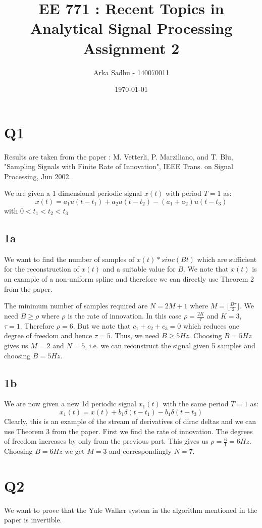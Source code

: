 \documentclass{article}
\title{EE 771 : Recent Topics in Analytical Signal Processing Assignment 2}
\author{Arka Sadhu - 140070011}
\date{\today}
\begin{document}
\maketitle

\section*{Q1}
Results are taken from the paper : M. Vetterli, P. Marziliano, and T. Blu, "Sampling Signals with Finite Rate of Innovation", IEEE Trans. on Signal Processing, Jun 2002.

We are given a 1 dimensional periodic signal $x(t)$ with period $T=1$ as:
$$x(t) = a_1 u(t - t_1) + a_2 u(t - t_2) - (a_1 + a_2) u(t - t_3)$$
with $0 < t_1 < t_2 < t_3$
\subsection*{1a}
We want to find the number of samples of $x(t) * sinc(Bt)$ which are sufficient for the reconstruction of $x(t)$ and a suitable value for $B$. We note that $x(t)$ is an example of a non-uniform spline and therefore we can directly use Theorem 2 from the paper.

The minimum number of samples required are $N = 2M + 1$ where $M = \lfloor \frac{B \tau}{2} \rfloor$. We need $B \ge \rho$ where $\rho$ is the rate of innovation. In this case $\rho = \frac{2K}{\tau}$ and $K = 3$, $\tau = 1$. Therefore $\rho = 6$. But we note that $c_1 + c_2 + c_3 = 0$ which reduces one degree of freedom and hence $\tau = 5$. Thus, we need $B \ge 5Hz$. Choosing $B = 5Hz$ gives us $M = 2$ and $N = 5$, i.e. we can reconstruct the signal given 5 samples and choosing $B = 5Hz$.

\subsection*{1b}
We are now given a new 1d periodic signal $x_1(t)$ with the same period $T=1$ as:
$$x_1(t) = x(t) + b_1 \delta (t - t_1) - b_1 \delta (t - t_3)$$
Clearly, this is an example of the stream of derivatives of dirac deltas and we can use Theorem 3 from the paper. First we find the rate of innovation. The degrees of freedom increases by only from the previous part. This gives us $\rho = \frac{6}{1} = 6Hz$. Choosing $B = 6Hz$ we get $M = 3$ and correspondingly $N=7$.

\section*{Q2}
We want to prove that the Yule Walker system in the algorithm mentioned in the paper is invertible.
\end{document}
